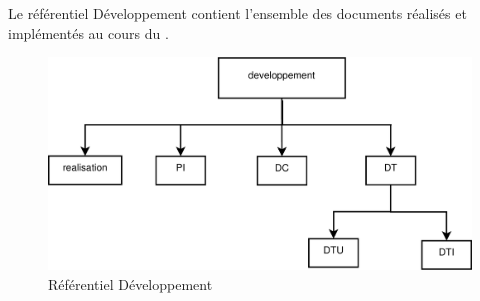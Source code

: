 
Le référentiel Développement contient l’ensemble des documents réalisés et implémentés au cours du \picCourt.

\clearpage

\begin{figure}[ht]
         \begin{center}
         \includegraphics[scale=0.45]{images/arboDeveloppement}
         \end{center}
         \caption{Référentiel Développement}
 \end{figure}
